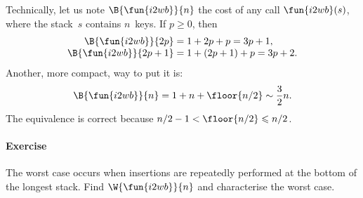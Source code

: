 Technically, let us note \(\B{\fun{i2wb}}{n}\) the cost of any call
\(\fun{i2wb}(s)\), where the stack~\(s\) contains \(n\)~keys. If \(p
\geqslant 0\), then
\begin{equation*}
\begin{array}{@{}r@{\;}c@{\;}l@{}}
\B{\fun{i2wb}}{2p}   & = & 1 +     2p + p = 3p + 1,\\
\B{\fun{i2wb}}{2p+1} & = & 1 + (2p+1) + p = 3p + 2.
\end{array}
\end{equation*}
Another, more compact, way to put it is:
\begin{equation*}
  \B{\fun{i2wb}}{n} = 1 + n + \floor{n/2} \sim \frac{3}{2}{n}.
\end{equation*}
The equivalence is correct because \(n/2-1 < \floor{n/2} \leqslant
n/2\).

\paragraph{Exercise}

The worst case occurs when insertions are repeatedly performed at the
bottom of the longest stack. Find \(\W{\fun{i2wb}}{n}\) and
characterise the worst case.


